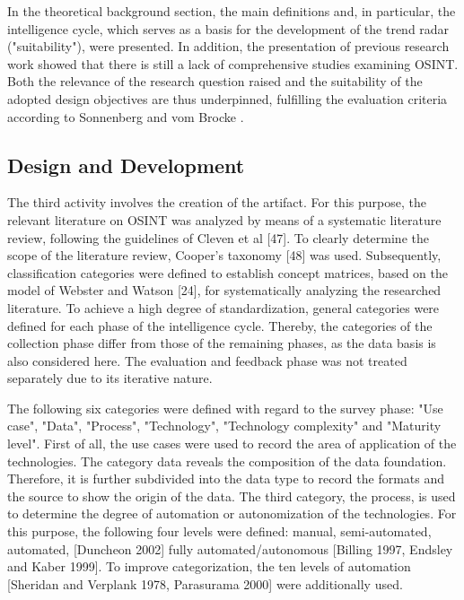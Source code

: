 \documentclass[10pt]{article}
\begin{document}
In the theoretical background section, the main definitions and, in
particular, the intelligence cycle, which serves as a basis for the
development of the trend radar ("suitability"), were presented. In
addition, the presentation of previous research work showed that there
is still a lack of comprehensive studies examining OSINT. Both the
relevance of the research question raised and the suitability of the
adopted design objectives are thus underpinned, fulfilling the
evaluation criteria according to Sonnenberg and vom Brocke \cite{Sonnenberg}.

\subsection{Design and Development}

The third activity involves the creation of the artifact. For this
purpose, the relevant literature on OSINT was analyzed by means of a
systematic literature review, following the guidelines of
Cleven et al [47]. To clearly determine the scope of the literature
review, Cooper's taxonomy [48] was used. Subsequently, classification
categories were defined to establish concept matrices, based on the
model of Webster and Watson [24], for systematically analyzing the
researched literature. To achieve a high degree of standardization,
general categories were defined for each phase of the intelligence
cycle. Thereby, the categories of the collection phase differ from
those of the remaining phases, as the data basis is also considered
here. The evaluation and feedback phase was not treated separately due
to its iterative nature.

The following six categories were defined with regard to the survey
phase: "Use case", "Data", "Process", "Technology", "Technology
complexity" and "Maturity level". First of all, the use cases were
used to record the area of application of the technologies. The
category data reveals the composition of the data foundation. Therefore,
it is further subdivided into the data type to record the formats and
the source to show the origin of the data. The third category, the
process, is used to determine the degree of automation or
autonomization of the technologies. For this purpose, the following
four levels were defined: manual, semi-automated, automated,
[Duncheon 2002] fully automated/autonomous
[Billing 1997, Endsley and Kaber 1999]. To improve categorization,
the ten levels of automation
    [Sheridan and Verplank 1978, Parasurama 2000] were additionally used.
\end{document}
